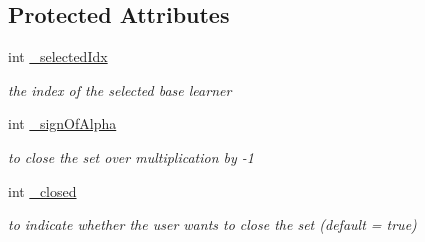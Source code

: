\subsection*{Protected Attributes}
\begin{DoxyCompactItemize}
\item 
\hypertarget{classMultiBoost_1_1ParasiteLearner_ae15923cfe41ae328431b26ad253dd219}{
int \hyperlink{classMultiBoost_1_1ParasiteLearner_ae15923cfe41ae328431b26ad253dd219}{\_\-selectedIdx}}
\label{classMultiBoost_1_1ParasiteLearner_ae15923cfe41ae328431b26ad253dd219}

\begin{DoxyCompactList}\small\item\em the index of the selected base learner \end{DoxyCompactList}\item 
\hypertarget{classMultiBoost_1_1ParasiteLearner_a865f5ee1841c1fc07dfcaec658df33bc}{
int \hyperlink{classMultiBoost_1_1ParasiteLearner_a865f5ee1841c1fc07dfcaec658df33bc}{\_\-signOfAlpha}}
\label{classMultiBoost_1_1ParasiteLearner_a865f5ee1841c1fc07dfcaec658df33bc}

\begin{DoxyCompactList}\small\item\em to close the set over multiplication by -\/1 \end{DoxyCompactList}\item 
\hypertarget{classMultiBoost_1_1ParasiteLearner_a3e7f11db43e74bf51a2da6ebf3f0ea74}{
int \hyperlink{classMultiBoost_1_1ParasiteLearner_a3e7f11db43e74bf51a2da6ebf3f0ea74}{\_\-closed}}
\label{classMultiBoost_1_1ParasiteLearner_a3e7f11db43e74bf51a2da6ebf3f0ea74}

\begin{DoxyCompactList}\small\item\em to indicate whether the user wants to close the set (default = true) \end{DoxyCompactList}\end{DoxyCompactItemize}
